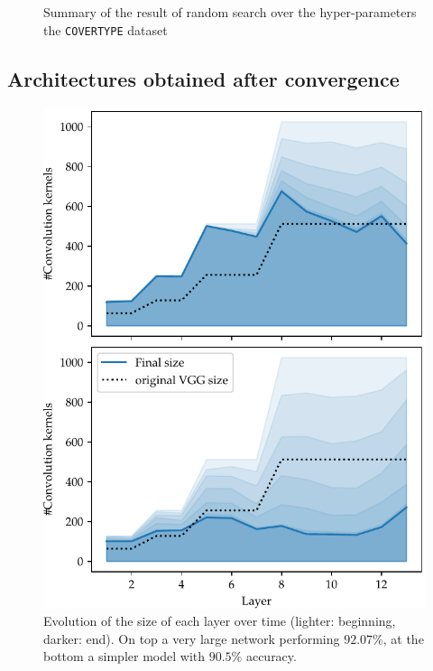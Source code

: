 \begin{figure}[t]
\begin{minipage}{2.7in}
\begin{center}
\vspace*{-5mm}
\caption{\label{figure_COVER} Summary of the result of random
search over the hyper-parameters the \texttt{COVERTYPE} dataset
}
\end{center}
\vspace*{-4mm}
\end{minipage}
\end{figure}

\subsection{Architectures obtained after convergence}

\begin{figure}[htb]
\begin{center}
\includegraphics[width=.7\columnwidth]{size_evolution}
\vspace*{-5mm} 
\caption{ Evolution of the size of
  each layer over time (lighter: beginning, darker: end). On top a very large
  network performing $92.07\%$, at the bottom a simpler model with $90.5\%$
  accuracy. 
} 
\label{fig:network_size_evolution}
\end{center}
\vspace*{-4mm}
\end{figure}

